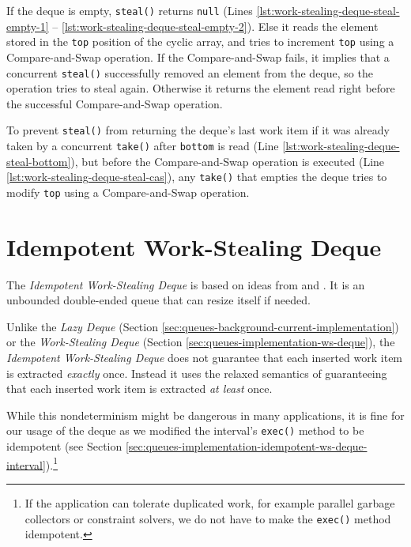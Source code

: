 If the deque is empty, \lstinline!steal()! returns \lstinline!null!
(Lines \ref{lst:work-stealing-deque-steal-empty-1} --
\ref{lst:work-stealing-deque-steal-empty-2}). Else it reads the
element stored in the \lstinline!top! position of the cyclic array,
and tries to increment \lstinline!top! using a Compare-and-Swap
operation. If the Compare-and-Swap fails, it implies that a concurrent
\lstinline!steal()! successfully removed an element from the deque, so
the operation tries to steal again. Otherwise it returns the element
read right before the successful Compare-and-Swap operation.

To prevent \lstinline!steal()! from returning the deque's last work
item if it was already taken by a concurrent \lstinline!take()! after
\lstinline!bottom! is read (Line
\ref{lst:work-stealing-deque-steal-bottom}), but before the
Compare-and-Swap operation is executed (Line
\ref{lst:work-stealing-deque-steal-cas}), any \lstinline!take()! that
empties the deque tries to modify \lstinline!top! using a
Compare-and-Swap operation.



\section{Idempotent Work-Stealing Deque}
\label{sec:queues-implementation-idempotent-ws-deque}

The \emph{Idempotent Work-Stealing Deque} is based on ideas from
\cite{Leijen2009} and \cite{Michael2009}. It is an unbounded
double-ended queue that can resize itself if needed.

Unlike the \emph{Lazy Deque} (Section
\ref{sec:queues-background-current-implementation}) or the
\emph{Work-Stealing Deque} (Section
\ref{sec:queues-implementation-ws-deque}), the \emph{Idempotent
Work-Stealing Deque} does not guarantee that each inserted work item
is extracted \emph{exactly} once. Instead it uses the relaxed
semantics of guaranteeing that each inserted work item is extracted
\emph{at least} once.

While this nondeterminism might be dangerous in many applications, it
is fine for our usage of the deque as we modified the interval's
\lstinline!exec()! method to be idempotent (see Section
\ref{sec:queues-implementation-idempotent-ws-deque-interval}).\footnote{If
  the application can tolerate duplicated work, for example parallel
  garbage collectors \cite{Flood2001} or constraint solvers, we do not
  have to make the \verb!exec()! method idempotent.}

